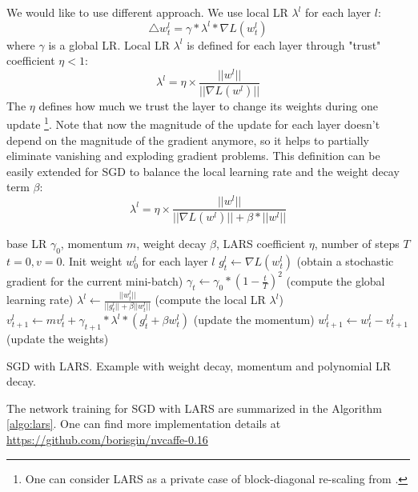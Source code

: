 \documentclass{article} %
\begin{document}
We would like to use different approach. We use local LR  $\lambda^l$ for each layer $l$:
\begin{equation}
     \triangle w^l_t  =  \gamma* \lambda^l * \nabla L(w^l_t) 
\end{equation}
where $\gamma$ is a global LR.  Local LR  $\lambda^l$ is defined for each layer through "trust" coefficient $\eta < 1$:
\begin{equation}
    \lambda^l =  \eta  \times \frac{||w^l||}{||\nabla L(w^l)||}
    \label{eq:lars}
\end{equation}
The $\eta$  defines  how much we trust  the layer to change its weights during one update
\footnote{
One can consider LARS as a private case of block-diagonal re-scaling from \cite{lafond2017diagonal}. 
}.  
Note that now the magnitude of the update for each layer doesn't depend on the magnitude of the gradient anymore, so it helps to partially eliminate vanishing and exploding gradient problems. This definition  can be easily extended for SGD to balance the local learning
rate and the weight decay term  $\beta$:
\begin{equation}
    \lambda^l = \eta  \times \frac{||w^l||} {||\nabla L(w^l)|| + \beta *||w^l|| }
    \label{eq:lars_wd}
\end{equation}

\begin{algorithm}[htb!]%
\begin{algorithmic}
 base LR $\gamma_0$, momentum $m$, weight decay $\beta$, LARS coefficient $\eta$, number of steps $T$
 $t = 0, v = 0$. Init weight $w_0^l$ for each layer $l$
        \STATE $g_t^l \gets \nabla L(w_t^l)$   (obtain a stochastic gradient for the current mini-batch)
        \STATE $\gamma_t \gets \gamma_0 * \left(1 - \frac{t}{T}\right)^2$ (compute the global learning rate)
        \STATE $\lambda^l \gets \frac{||w_t^l||}{||g_t^l|| + \beta ||w_t^l||}$       (compute the local LR  $\lambda^l$)
        \STATE $v_{t+1}^l \gets mv_t^l + \gamma_{t+1} * \lambda^l * (g_t^l + \beta w_t^l)$     (update the momentum)
        \STATE $w_{t+1}^l \gets w_t^l - v_{t+1}^l$ (update the 
        weights)
\ENDWHILE
\end{algorithmic}
 \caption{SGD with LARS. Example with weight decay, momentum and polynomial LR decay. \label{algo:lars}}
\end{algorithm}
The network training for SGD with LARS are summarized in the Algorithm \ref{algo:lars}. One can find more implementation details  at \href{https://github.com/borisgin/nvcaffe-0.16}{https://github.com/borisgin/nvcaffe-0.16}
\end{document}
